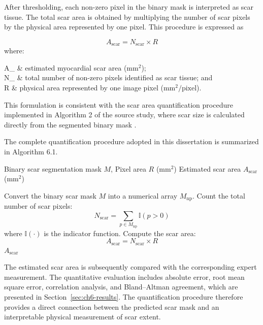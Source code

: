 After thresholding, each non-zero pixel in the binary mask is interpreted as scar tissue. The total scar area is obtained by multiplying the number of scar pixels by the physical area represented by one pixel. This procedure is expressed as

\begin{equation}
	A_{\mathrm{scar}} = N_{\mathrm{scar}} \times R
	\label{eq:ch6-scar-area}
\end{equation}
where:
\begin{conditions}
	A_{} & estimated myocardial scar area ($\text{mm}^2$); \\
	N_{} & total number of non-zero pixels identified as scar tissue; and \\
	R & physical area represented by one image pixel ($\text{mm}^2/\text{pixel}$).
\end{conditions}

This formulation is consistent with the scar area quantification procedure implemented in Algorithm 2 of the source study, where scar size is calculated directly from the segmented binary mask \citep{Riandini2026Access}.

The complete quantification procedure adopted in this dissertation is summarized in Algorithm 6.1.

\begin{algorithm}[htbp]
	\caption{Automated Myocardial Scar Area Quantification}
	\label{alg:ch6-scar-quantification}
	\begin{algorithmic}[1]
		\Require Binary scar segmentation mask $M$, Pixel area $R$ ($\text{mm}^2$)
		\Ensure Estimated scar area $A_{\mathrm{scar}}$ ($\text{mm}^2$)
		\vspace{2pt}
		
		\State Convert the binary scar mask $M$ into a numerical array $M_{\mathrm{np}}$.
		\State Count the total number of scar pixels:
		\[
		N_{\mathrm{scar}} = \sum_{p \in M_{\mathrm{np}}} \mathbb{I}(p > 0)
		\]
		\Statex \hspace{\algorithmicindent} where $\mathbb{I}(\cdot)$ is the indicator function.
		\State Compute the scar area:
		\[
		A_{\mathrm{scar}} = N_{\mathrm{scar}} \times R
		\]
		\State \Return $A_{\mathrm{scar}}$
	\end{algorithmic}
\end{algorithm}

The estimated scar area is subsequently compared with the corresponding expert measurement. The quantitative evaluation includes absolute error, root mean square error, correlation analysis, and Bland--Altman agreement, which are presented in Section~\ref{sec:ch6-results}. The quantification procedure therefore provides a direct connection between the predicted scar mask and an interpretable physical measurement of scar extent.

